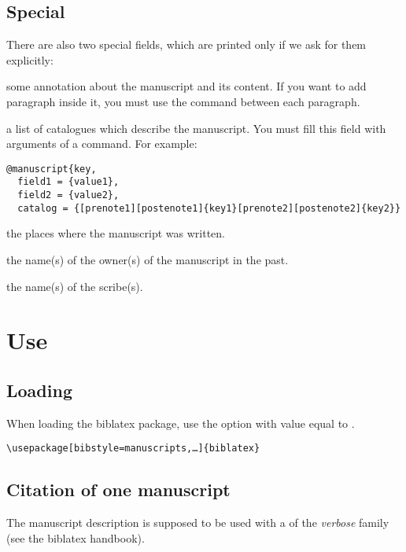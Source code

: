 \documentclass{ltxdockit}[2011/03/25]
\newcommand{\biblatex}{biblatex\xspace}
\begin{document}
\subsection{Special}\label{fields:special}
There are also two special fields, which are printed only if we ask for them explicitly: 

\begin{fieldlist}
 some annotation about the manuscript and its content. If you want to add paragraph inside it, you must use the  command between each paragraph.


 a list of catalogues which describe the manuscript. You must fill this field with arguments of a  command. For example:

\begin{verbatim}
@manuscript{key,
  field1 = {value1},
  field2 = {value2},
  catalog = {[prenote1][postenote1]{key1}[prenote2][postenote2]{key2}}
\end{verbatim}


 the places where the manuscript was written.

 the name(s) of the owner(s) of the manuscript in the past.

 the name(s) of the scribe(s).

\end{fieldlist}

\section{Use}
\subsection{Loading}

When loading the \biblatex package, use the option  with value equal to .

\begin{verbatim}
\usepackage[bibstyle=manuscripts,…]{biblatex}
\end{verbatim}

\subsection{Citation of one manuscript}

The manuscript description is supposed to be used with a  of the \emph{verbose} family (see the \biblatex handbook).
\end{document}
